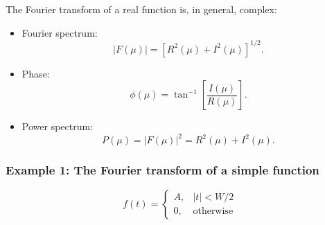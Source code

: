\begin{frame}
The Fourier transform of a real function is, in general, complex:
\begin{itemize}
\item Fourier spectrum:
\begin{equation}
|F(\mu)| = \left [R^{2}(\mu) + I^{2}(\mu) \right ]^{1/2}.
\end{equation}
\item Phase:
\begin{equation}
\phi(\mu) = \tan^{-1}\left [ \dfrac{I(\mu)}{R(\mu)} \right ].
\end{equation}
\item Power spectrum:
\begin{equation}
P(\mu) = |F(\mu)|^{2} = R^{2}(\mu) + I^{2}(\mu).
\end{equation}
\end{itemize}
\end{frame}

%


\begin{frame}
\frametitle{Example 1: The Fourier transform of a simple function}
\begin{equation*}
f(t) =
\left \{
\begin{array}{ll}
A, & |t| < W/2 \\
0, & \text{otherwise}
\end{array}
\right .
\end{equation*}
\end{frame}


